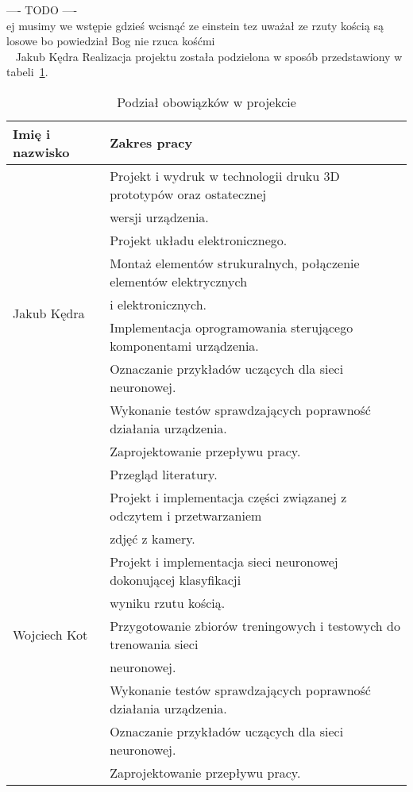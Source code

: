 ---- TODO ---- \\
ej musimy we wstępie gdzieś wcisnąć ze einstein tez uważał ze rzuty kością są losowe bo powiedział Bog nie rzuca kośćmi \\
~ Jakub Kędra
\newpage
Realizacja projektu została podzielona w sposób przedstawiony w tabeli~\ref{tab:podzial}.
\begin{table} [H]
    \centering
    \caption{Podział obowiązków w projekcie}
    \label{tab:podzial}
    \begin{tabular}{|l|l|}
        \hline
        Imię i nazwisko & Zakres pracy \\
        \hline
        \multirow{9}{*}{Jakub Kędra} 
            & Projekt i wydruk w technologii druku 3D prototypów oraz ostatecznej \\
            & wersji urządzenia. \\
            & Projekt układu elektronicznego. \\
            & Montaż elementów strukuralnych, połączenie elementów elektrycznych \\
            & i elektronicznych. \\
            & Implementacja oprogramowania sterującego komponentami urządzenia. \\
            & Oznaczanie przykładów uczących dla sieci neuronowej. \\
            & Wykonanie testów sprawdzających poprawność działania urządzenia. \\
            & Zaprojektowanie przepływu pracy. \\
            & Przegląd literatury. \\
        \hline
        \multirow{11}{*}{Wojciech Kot} 
            & Projekt i implementacja części związanej z odczytem i przetwarzaniem \\
            & zdjęć z kamery. \\
            & Projekt i implementacja sieci neuronowej dokonującej klasyfikacji \\
            & wyniku rzutu kością. \\
            & Przygotowanie zbiorów treningowych i testowych do trenowania sieci \\
            & neuronowej. \\
            & Wykonanie testów sprawdzających poprawność działania urządzenia. \\
            & Oznaczanie przykładów uczących dla sieci neuronowej. \\
            & Zaprojektowanie przepływu pracy. \\

\end{tabular}
\end{table}
